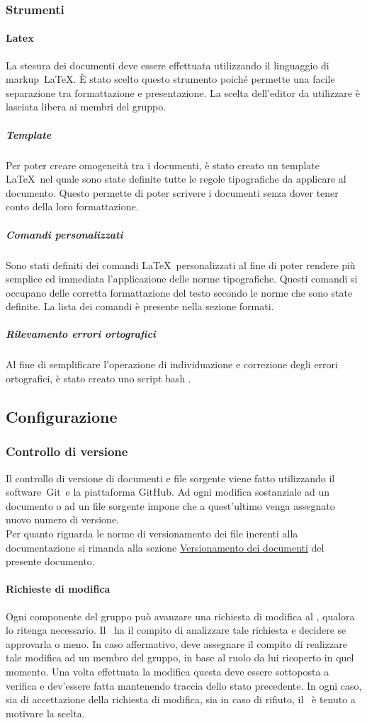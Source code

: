 \documentclass[../NormeProgetto.tex]{subfiles}
\begin{document}
		\subsubsection{Strumenti}
			\paragraph{Latex}
				La stesura dei documenti deve essere effettuata utilizzando il linguaggio di markup\g\ \LaTeX\g. È stato scelto questo strumento poiché permette una facile separazione tra formattazione e presentazione. La scelta dell'editor da utilizzare è lasciata libera ai membri del gruppo.
				\subparagraph{Template}
					Per poter creare omogeneità tra i documenti, è stato creato un template \LaTeX\g\ nel quale sono state definite tutte le regole tipografiche da applicare al documento. Questo permette di poter scrivere i documenti senza dover tener conto della loro formattazione.
				\subparagraph{Comandi personalizzati}
					Sono stati definiti dei comandi \LaTeX\g\ personalizzati al fine di poter rendere più semplice ed immediata l'applicazione delle norme tipografiche. Questi comandi si occupano delle corretta formattazione del testo secondo le norme che sono state definite. La lista dei comandi è presente nella sezione formati.
				\subparagraph{Rilevamento errori ortografici}
					Al fine di semplificare l'operazione di individuazione e correzione degli errori ortografici, è stato creato uno script bash .

\subsection{Configurazione}
	\subsubsection{Controllo di versione}
		Il controllo di versione di documenti e file sorgente viene fatto utilizzando il software\g\ Git\g\ e la piattaforma GitHub\g. Ad ogni modifica sostanziale ad un documento o ad un file sorgente impone che a quest'ultimo venga assegnato nuovo numero di versione. \\ Per quanto riguarda le norme di versionamento dei file inerenti alla documentazione si rimanda alla sezione \hyperref[sec:Versionamento dei documenti]{Versionamento dei documenti} del presente documento.
		\paragraph{Richieste di modifica}
			Ogni componente del gruppo può avanzare una richiesta di modifica al \responsabilediprogetto, qualora lo ritenga necessario. Il \responsabilediprogetto\ ha il compito di analizzare tale richiesta e decidere se approvarla o meno. In caso affermativo, deve assegnare il compito di realizzare tale modifica ad un membro del gruppo, in base al ruolo da lui ricoperto in quel momento. Una volta effettuata la modifica questa deve essere sottoposta a verifica e dev'essere fatta mantenendo traccia dello stato precedente. In ogni caso, sia di accettazione della richiesta di modifica, sia in caso di rifiuto, il \responsabilediprogetto\ è tenuto a motivare la scelta.
\end{document}
